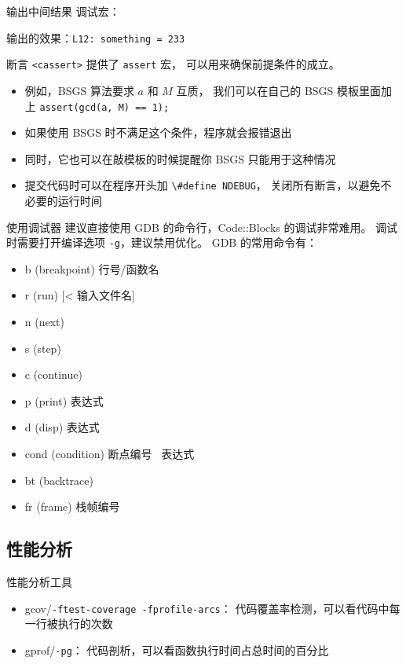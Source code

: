 \documentclass[10pt,mathserif]{beamer}
\begin{document}
\begin{frame}{输出中间结果}
	调试宏：
	
	输出的效果：\lstinline!L12: something = 233!
\end{frame}

\begin{frame}{断言}
	\lstinline|<cassert>| 提供了 \lstinline|assert| 宏，
	可以用来确保前提条件的成立。
	\begin{itemize}
		\item 例如，BSGS 算法要求 $a$ 和 $M$ 互质，
			我们可以在自己的 BSGS 模板里面加上
			\lstinline|assert(gcd(a, M) == 1);|
		\item 如果使用 BSGS 时不满足这个条件，程序就会报错退出
		\item 同时，它也可以在敲模板的时候提醒你 BSGS 只能用于这种情况
		\item 提交代码时可以在程序开头加 \lstinline|\#define NDEBUG|，
			关闭所有断言，以避免不必要的运行时间
	\end{itemize}
\end{frame}

\begin{frame}{使用调试器}
	建议直接使用 GDB 的命令行，Code::Blocks 的调试非常难用。
	调试时需要打开编译选项 \lstinline!-g!，建议禁用优化。
	GDB 的常用命令有：
	\begin{itemize}
		\item b (breakpoint) 行号/函数名
		\item r (run) [< 输入文件名]
		\item n (next)
		\item s (step)
		\item c (continue)
		\item p (print) 表达式
		\item d (disp) 表达式
		\item cond (condition) 断点编号 \  表达式
		\item bt (backtrace)
		\item fr (frame) 栈帧编号
	\end{itemize}
\end{frame}

\subsection{性能分析}
\begin{frame}{性能分析工具}
	\begin{itemize}
		\item gcov/\lstinline|-ftest-coverage -fprofile-arcs|：
			代码覆盖率检测，可以看代码中每一行被执行的次数
		\item gprof/\lstinline|-pg|：
			代码剖析，可以看函数执行时间占总时间的百分比
	\end{itemize}
\end{frame}
\end{document}
